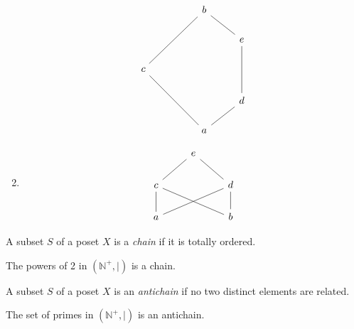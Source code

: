 \begin{example}
\begin{enumerate}
\[\begin{tikzcd}
	&& b \\
	&&& e \\
	c \\
	&&& d \\
	&& a
	\arrow[no head, from=5-3, to=4-4]
	\arrow[no head, from=4-4, to=2-4]
	\arrow[no head, from=2-4, to=1-3]
	\arrow[no head, from=5-3, to=3-1]
	\arrow[no head, from=3-1, to=1-3]
\end{tikzcd}\]
\item
\[\begin{tikzcd}
	& e \\
	c && d \\
	a && b
	\arrow[no head, from=3-1, to=2-1]
	\arrow[no head, from=2-1, to=1-2]
	\arrow[no head, from=3-3, to=2-3]
	\arrow[no head, from=2-3, to=1-2]
	\arrow[no head, from=3-1, to=2-3]
	\arrow[no head, from=3-3, to=2-1]
\end{tikzcd}\]
\end{enumerate}
\end{example}
\begin{definition}
    A subset \( S \) of a poset \( X \) is a \emph{chain} if it is totally ordered.
\end{definition}
\begin{example}
    The powers of 2 in \( (\mathbb N^+, \mid) \) is a chain.
\end{example}
\begin{definition}
    A subset \( S \) of a poset \( X \) is an \emph{antichain} if no two distinct elements are related.
\end{definition}
\begin{example}
    The set of primes in \( (\mathbb N^+, \mid) \) is an antichain.
\end{example}

